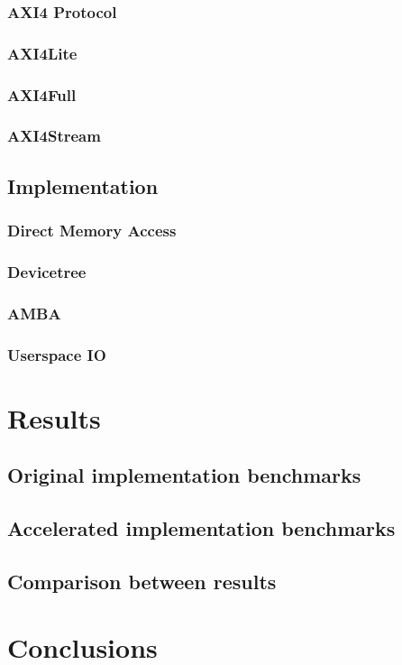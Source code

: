 \documentclass{iccmemoria}
\begin{document}
  \subsection{AXI4 Protocol}
  \subsection{AXI4Lite}
  \subsection{AXI4Full}
  \subsection{AXI4Stream}
\section{Implementation}
  \subsection{Direct Memory Access}
  \subsection{Devicetree}
  \subsection{AMBA}
  \subsection{Userspace IO}

\chapter{Results}
\section{Original implementation benchmarks}
\section{Accelerated implementation benchmarks}
\section{Comparison between results}


\chapter{Conclusions}
\end{document}
